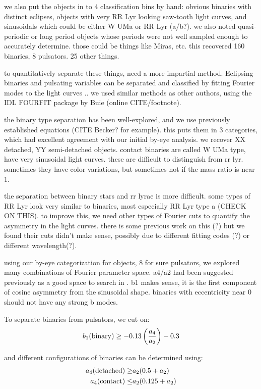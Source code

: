 \documentclass[]{emulateapj}
\begin{document}
we also put the objects in to 4 classification bins by hand: obvious binaries with distinct eclipses, objects with very RR Lyr looking saw-tooth light curves, and sinusoidals which could be either W UMa or RR Lyr (a/b?). we also noted quasi-periodic or long period objects whose periods were not well sampled enough to accurately determine. those could be things like Miras, etc. this recovered 160 binaries, 8 pulsators. 25 other things.


to quantitatively separate these things, need a more impartial method. Eclipsing binaries and pulsating variables can be separated and classified by fitting Fourier modes to the light curves \citep{pojmanski2002,nefs2012}.. we used similar methods as other authors, using the IDL FOURFIT package by Buie (online CITE/footnote).


the binary type separation has been well-explored, and we use previously established equations (CITE Becker? for example). this puts them in 3 categories, which had excellent agreement with our initial by-eye analysis. we recover XX detached, YY semi-detached objects. contact binaries are called W UMa type, have very sinusoidal light curves. these are difficult to distinguish from rr lyr. sometimes they have color variations, but sometimes not if the mass ratio is near 1.

the separation between binary stars and rr lyrae is more difficult. some types of RR Lyr look very similar to binaries, most especially RR Lyr type a (CHECK ON THIS).  to improve this, we need other types of Fourier cuts to quantify the asymmetry in the light curves. there is some previous work on this (\citep{aaas}?) but we found their cuts didn't make sense, possibly due to different fitting codes (?) or different wavelength(?). 

using our by-eye categorization for objects, 8 for sure pulsators, we explored many combinations of Fourier parameter space. a4/a2 had been suggested previously as a good space to search in \citep{asas}. b1 makes sense, it is the first component of cosine asymmetry from the sinusoidal shape. binaries with eccentricity near 0 should not have any strong b modes. 



To separate binaries from pulsators, we cut on:
\begin{equation}
b_1({\rm binary}) \ge  -0.13\left( \frac{a_4}{a_2} \right)- 0.3
\end{equation}

and different configurations of binaries can be determined using:
\begin{eqnarray}
a_4({\rm detached}) \ge & a_2(0.5 + a_2)\\
a_4({\rm contact}) \le & a_2(0.125 + a_2)
\end{eqnarray}
\end{document}
